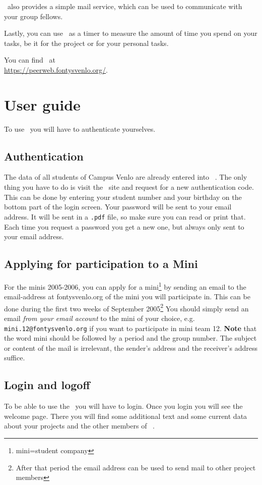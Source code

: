 \peerweb\  also provides a simple mail service, which can be used to
communicate with your group fellows. 

Lastly, you can use \peerweb\  as a
timer to measure the amount of time you spend on your tasks, be it for
the project or for your personal tasks.

You can find \peerweb\  at \\\url{https://peerweb.fontysvenlo.org/}.

\section{User guide}
To use \peerweb\  you will have to authenticate yourselves.

\subsection{Authentication}
The data of all students of Campus Venlo are already entered into
\peerweb\ .
The only thing you have to do is visit the \peerweb\  site and request
for a new authentication code. This can be done by entering your
student number and your birthday on the bottom part of the login
screen. Your password will be sent to your \Fontys email
address. It will be sent in a \texttt{.pdf} file, so make sure you can read or
print that. Each time you request a password you get a new one, but
always only sent to your \Fontys email address.

\subsection{Applying for participation to a Mini}
For the minis 2005-2006, you can apply for a
mini\footnote{mini=student company} by sending an email
to the email-address at fontysvenlo.org of the mini you will
participate in. This can be done 
during the first two weeks of September 2005\footnote{After that
period the email address can be used to send mail to other project members}
You should simply send an email \textit{from your \Fontys email
account} to the mini of your choice,
e.g. \verb#mini.12@fontysvenlo.org# if you want to participate in
mini team 12. \textbf{Note} that the word mini should be followed by a
period and the group number. The subject or content of the mail is
irrelevant, the sender's address and the receiver's address suffice.

\subsection{Login and logoff}
To be able to use the \peerweb\  you will have to login. Once you login
you will see the welcome page. There you will find some additional
text and some current data about your projects and the other members
of \peerweb\ . 

